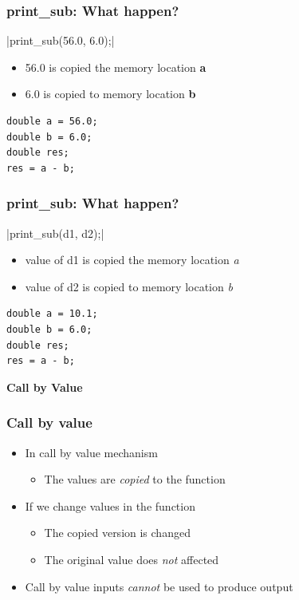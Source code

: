 \documentclass{../c-lecture}
\begin{document}
\begin{frame}[fragile]
  \frametitle{print_sub: What happen?}
  |print_sub(56.0, 6.0);|
  \begin{itemize}
    \item 56.0 is copied the memory location \textbf{\color{LimeGreen} a}
    \item 6.0 is copied to memory location \textbf{\color{Orange} b}
  \end{itemize}
  \begin{verbatim}
double a = 56.0;
double b = 6.0;
double res;
res = a - b;
  \end{verbatim}
\end{frame}

\begin{frame}[fragile]
  \frametitle{print_sub: What happen?}
  |print_sub(d1, d2);|
  \begin{itemize}
    \item
      value of d1 is copied the memory location
      \textit{\color{LimeGreen} a}
    \item
      value of d2 is copied to memory location
      \textit{\color{YellowOrange} b}
  \end{itemize}
  \begin{verbatim}
double a = 10.1;
double b = 6.0;
double res;
res = a - b;
  \end{verbatim}
  \textbf{\color{RubineRed} Call by Value}
\end{frame}

\begin{frame}
  \frametitle{Call by value}
  \begin{itemize}
    \item In call by value mechanism
    \begin{itemize}
      \item
        The values are \textit{\color{Orange} copied} to the function
    \end{itemize}
    \item If we change values in the function
    \begin{itemize}
      \item The copied version is changed
      \item
        The original value does \textit{\color{RubineRed} not} affected
    \end{itemize}
    \item
      Call by value inputs \textit{\color{RubineRed} cannot} be used to
      produce output
  \end{itemize}
\end{frame}
\end{document}
